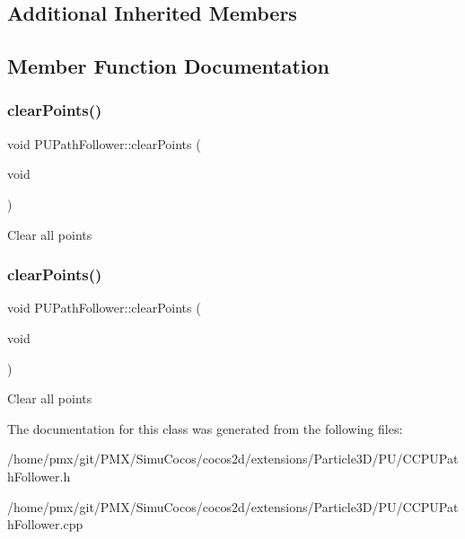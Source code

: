 \subsection*{Additional Inherited Members}


\subsection{Member Function Documentation}
\mbox{\label{classPUPathFollower_a44c13a6b8f8e2602361fae81842f4a1a}} 
\subsubsection{\texorpdfstring{clear\+Points()}{clearPoints()}\hspace{0.1cm}{\footnotesize\ttfamily [1/2]}}
{\footnotesize\ttfamily void P\+U\+Path\+Follower\+::clear\+Points (\begin{DoxyParamCaption}\item[{void}]{ }\end{DoxyParamCaption})}

Clear all points \mbox{\label{classPUPathFollower_a44c13a6b8f8e2602361fae81842f4a1a}} 
\subsubsection{\texorpdfstring{clear\+Points()}{clearPoints()}\hspace{0.1cm}{\footnotesize\ttfamily [2/2]}}
{\footnotesize\ttfamily void P\+U\+Path\+Follower\+::clear\+Points (\begin{DoxyParamCaption}\item[{void}]{ }\end{DoxyParamCaption})}

Clear all points 

The documentation for this class was generated from the following files\+:\begin{DoxyCompactItemize}
\item 
/home/pmx/git/\+P\+M\+X/\+Simu\+Cocos/cocos2d/extensions/\+Particle3\+D/\+P\+U/C\+C\+P\+U\+Path\+Follower.\+h\item 
/home/pmx/git/\+P\+M\+X/\+Simu\+Cocos/cocos2d/extensions/\+Particle3\+D/\+P\+U/C\+C\+P\+U\+Path\+Follower.\+cpp\end{DoxyCompactItemize}
